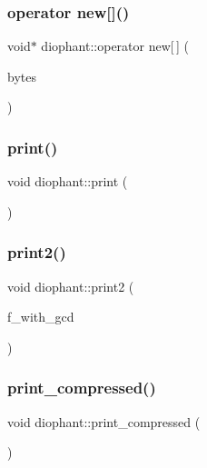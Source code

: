 \subsubsection{\texorpdfstring{operator new[]()}{operator new[]()}}
{\footnotesize\ttfamily void$\ast$ diophant\+::operator new\mbox{[}$\,$\mbox{]} (\begin{DoxyParamCaption}\item[{size\+\_\+t}]{bytes }\end{DoxyParamCaption})}

\mbox{\label{classdiophant_a887f3ce883ac947ac177d50e727bf5e8}} 
\subsubsection{\texorpdfstring{print()}{print()}}
{\footnotesize\ttfamily void diophant\+::print (\begin{DoxyParamCaption}{ }\end{DoxyParamCaption})}

\mbox{\label{classdiophant_af4b3684270925d0d766a3a0d3089e195}} 
\subsubsection{\texorpdfstring{print2()}{print2()}}
{\footnotesize\ttfamily void diophant\+::print2 (\begin{DoxyParamCaption}\item[{\mbox{\hyperlink{galois_8h_a09fddde158a3a20bd2dcadb609de11dc}{I\+NT}}}]{f\+\_\+with\+\_\+gcd }\end{DoxyParamCaption})}

\mbox{\label{classdiophant_af1e2f544376e1b3ca43f519224858141}} 
\subsubsection{\texorpdfstring{print\+\_\+compressed()}{print\_compressed()}}
{\footnotesize\ttfamily void diophant\+::print\+\_\+compressed (\begin{DoxyParamCaption}{ }\end{DoxyParamCaption})}

